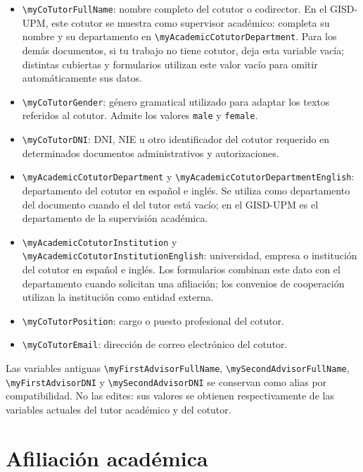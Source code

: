 \begin{itemize}
  \item \texttt{\textbackslash{}myCoTutorFullName}: nombre completo del cotutor o codirector. En el GISD-UPM, este cotutor se muestra como supervisor académico: completa su nombre y su departamento en \texttt{\textbackslash{}myAcademicCotutorDepartment}. Para los demás documentos, si tu trabajo no tiene cotutor, deja esta variable vacía; distintas cubiertas y formularios utilizan este valor vacío para omitir automáticamente sus datos.
  \item \texttt{\textbackslash{}myCoTutorGender}: género gramatical utilizado para adaptar los textos referidos al cotutor. Admite los valores \texttt{male} y \texttt{female}.
  \item \texttt{\textbackslash{}myCoTutorDNI}: DNI, NIE u otro identificador del cotutor requerido en determinados documentos administrativos y autorizaciones.
  \item \texttt{\textbackslash{}myAcademicCotutorDepartment} y \texttt{\textbackslash{}myAcademicCotutorDepartmentEnglish}: departamento del cotutor en español e inglés. Se utiliza como departamento del documento cuando el del tutor está vacío; en el GISD-UPM es el departamento de la supervisión académica.
  \item \texttt{\textbackslash{}myAcademicCotutorInstitution} y \texttt{\textbackslash{}myAcademicCotutorInstitutionEnglish}: universidad, empresa o institución del cotutor en español e inglés. Los formularios combinan este dato con el departamento cuando solicitan una afiliación; los convenios de cooperación utilizan la institución como entidad externa.
  \item \texttt{\textbackslash{}myCoTutorPosition}: cargo o puesto profesional del cotutor.
  \item \texttt{\textbackslash{}myCoTutorEmail}: dirección de correo electrónico del cotutor.
\end{itemize}

Las variables antiguas \texttt{\textbackslash{}myFirstAdvisorFullName}, \texttt{\textbackslash{}mySecondAdvisorFullName}, \texttt{\textbackslash{}myFirstAdvisorDNI} y \texttt{\textbackslash{}mySecondAdvisorDNI} se conservan como alias por compatibilidad. No las edites: sus valores se obtienen respectivamente de las variables actuales del tutor académico y del cotutor.

\section{Afiliación académica}

